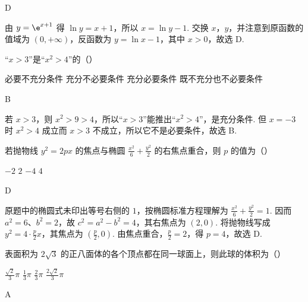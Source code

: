 \begin{answer}
D
\end{answer}

\begin{solution}
由 \(y=\e^{x+1}\) 得 \(\ln y=x+1\)，所以 \(x=\ln y-1\). 交换 \(x\)，\(y\)，并注意到原函数的值域为 \((0,+\infty)\)，反函数为 \(y=\ln x-1\)，其中 \(x>0\)，故选 D.
\end{solution}

\begin{problem}
“\(x > 3\)”是“\(x^2 > 4\)”的（\quad）

\choices
    {必要不充分条件}
    {充分不必要条件}
    {充分必要条件}
    {既不充分也不必要条件}
\end{problem}

\begin{answer}
B
\end{answer}

\begin{solution}
若 \(x>3\)，则 \(x^2>9>4\)，所以“\(x>3\)”能推出“\(x^2>4\)”，是充分条件. 但 \(x=-3\) 时 \(x^2>4\) 成立而 \(x>3\) 不成立，所以它不是必要条件，故选 B.
\end{solution}

\begin{problem}
若抛物线 \( y^{2} = 2px \) 的焦点与椭圆 \( \frac{x^2}{6} + \frac{y^2}{2} \) 的右焦点重合，则 \( p \) 的值为（\quad）

\choices
    {\(-2\)}
    {\(2\)}
    {\(-4\)}
    {\(4\)}
\end{problem}

\begin{answer}
D
\end{answer}

\begin{solution}
原题中的椭圆式未印出等号右侧的 \(1\)，按椭圆标准方程理解为 \(\frac{x^2}{6}+\frac{y^2}{2}=1\). 因而 \(a^2=6\)、\(b^2=2\)，故 \(c^2=a^2-b^2=4\)，其右焦点为 \((2,0)\). 将抛物线写成 \(y^2=4\cdot\frac p2x\)，其焦点为 \((\frac p2,0)\). 由焦点重合，\(\frac p2=2\)，得 \(p=4\)，故选 D.
\end{solution}

\begin{problem}
表面积为 \(2\sqrt{3}\) 的正八面体的各个顶点都在同一球面上，则此球的体积为（\quad）

\choices
    {\(\frac{\sqrt{2}}{3}\pi\)}
    {\(\frac{1}{3}\pi\)}
    {\(\frac{2}{3}\pi\)}
    {\(\frac{2\sqrt{2}}{3}\pi\)}
\end{problem}

\begin{answer}
A
\end{answer}

